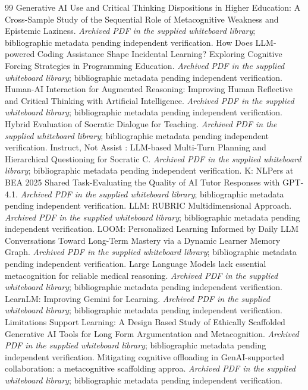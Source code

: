\begin{thebibliography}{99}
 Generative AI Use and Critical Thinking Dispositions in Higher Education: A Cross-Sample Study of the Sequential Role of Metacognitive Weakness and Epistemic Laziness. \emph{Archived PDF in the supplied whiteboard library}; bibliographic metadata pending independent verification.
 How Does LLM-powered Coding Assistance Shape Incidental Learning? Exploring Cognitive Forcing Strategies in Programming Education. \emph{Archived PDF in the supplied whiteboard library}; bibliographic metadata pending independent verification.
 Human-AI Interaction for Augmented Reasoning: Improving Human Reflective and Critical Thinking with Artificial Intelligence. \emph{Archived PDF in the supplied whiteboard library}; bibliographic metadata pending independent verification.
 Hybrid Evaluation of Socratic Dialogue for Teaching. \emph{Archived PDF in the supplied whiteboard library}; bibliographic metadata pending independent verification.
 Instruct, Not Assist : LLM-based Multi-Turn Planning and Hierarchical Questioning for Socratic C. \emph{Archived PDF in the supplied whiteboard library}; bibliographic metadata pending independent verification.
 K: NLPers at BEA 2025 Shared Task-Evaluating the Quality of AI Tutor Responses with GPT-4.1. \emph{Archived PDF in the supplied whiteboard library}; bibliographic metadata pending independent verification.
 LLM: RUBRIC Multidimensional Approach. \emph{Archived PDF in the supplied whiteboard library}; bibliographic metadata pending independent verification.
 LOOM: Personalized Learning Informed by Daily LLM Conversations Toward Long-Term Mastery via a Dynamic Learner Memory Graph. \emph{Archived PDF in the supplied whiteboard library}; bibliographic metadata pending independent verification.
 Large Language Models lack essential metacognition for reliable medical reasoning. \emph{Archived PDF in the supplied whiteboard library}; bibliographic metadata pending independent verification.
 LearnLM: Improving Gemini for Learning. \emph{Archived PDF in the supplied whiteboard library}; bibliographic metadata pending independent verification.
 Limitations Support Learning: A Design Based Study of Ethically Scaffolded Generative AI Tools for Long Form Argumentation and Metacognition. \emph{Archived PDF in the supplied whiteboard library}; bibliographic metadata pending independent verification.
 Mitigating cognitive offloading in GenAI-supported collaboration: a metacognitive scaffolding approa. \emph{Archived PDF in the supplied whiteboard library}; bibliographic metadata pending independent verification.

\end{thebibliography}

